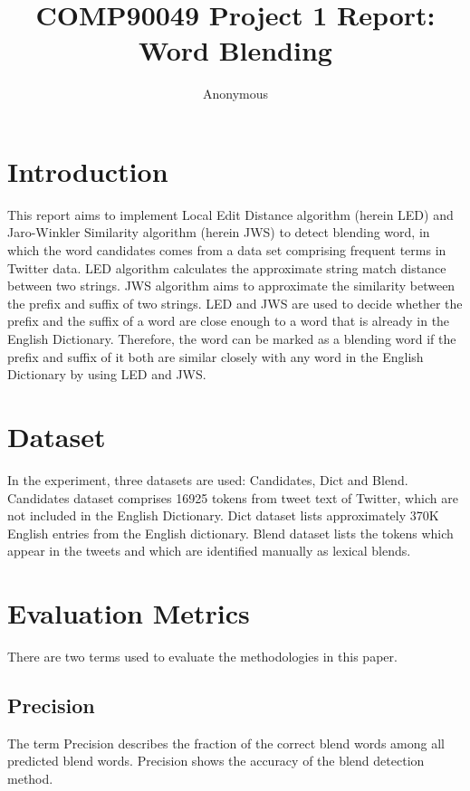 \documentclass[11pt]{article}
\title{COMP90049 Project 1 Report: Word Blending}
\author
{Anonymous}
\begin{document}
\maketitle



\section{Introduction}

This report aims to implement Local Edit Distance algorithm (herein LED) and Jaro-Winkler Similarity algorithm (herein JWS) to detect blending word, in which the word candidates comes from a data set comprising frequent terms in Twitter data. LED algorithm calculates the approximate string match distance between two strings. JWS algorithm aims to approximate the similarity between the prefix and suffix of two strings. LED and JWS are used to decide whether the prefix and the suffix of a word are close enough to a word that is already in the English Dictionary. Therefore, the word can be marked as a blending word if the prefix and suffix of it both are similar closely with any word in the English Dictionary by using LED and JWS.

\section{Dataset}
In the experiment, three datasets are used: Candidates, Dict and Blend. Candidates dataset comprises 16925 tokens from tweet text  \citep{Eis+10} of Twitter, which are not included in the English Dictionary. Dict dataset lists approximately 370K English entries from the English dictionary. Blend dataset\citep{DerKni15, DasGho17, CooSte10} lists the tokens which appear in the tweets and which are identified manually as lexical blends.

\section{Evaluation Metrics}

There are two terms used to evaluate the methodologies in this paper.

\subsection{Precision}
The term Precision describes the fraction of the correct blend words among all predicted blend words. Precision shows the accuracy of the  blend detection method.
\end{document}
